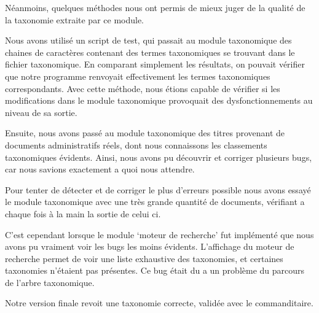 Néanmoins, quelques méthodes nous ont permis de mieux juger de la qualité de la taxonomie extraite par ce module. 

Nous avons utilisé un script de test, qui passait au module taxonomique des chaines de caractères contenant des termes taxonomiques se trouvant dans le fichier taxonomique.
En comparant simplement les résultats, on pouvait vérifier que notre programme renvoyait effectivement les termes taxonomiques correspondants.
Avec cette méthode, nous étions capable de vérifier si les modifications dans le module taxonomique provoquait des dysfonctionnements au niveau de sa sortie. 

Ensuite, nous avons passé au module taxonomique des titres provenant de documents administratifs réels, dont nous connaissons les classements taxonomiques évidents.
Ainsi, nous avons pu découvrir et corriger plusieurs bugs, car nous savions exactement a quoi nous attendre.

Pour tenter de détecter et de corriger le plus d'erreurs possible nous avons essayé le module taxonomique avec une très grande quantité de documents, vérifiant a chaque fois à la main la sortie de celui ci. 

C'est cependant lorsque le module `moteur de recherche' fut implémenté que nous avons pu vraiment voir les bugs les moins évidents.
L'affichage du moteur de recherche permet de voir une liste exhaustive des taxonomies, et certaines taxonomies n'étaient pas présentes.
Ce bug était du a un problème du parcours de l'arbre taxonomique.


Notre version finale revoit une taxonomie correcte, validée avec le commanditaire.




